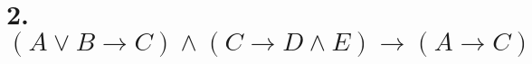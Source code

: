 \section*{2. $(A \lor B \rightarrow C) \land (C \rightarrow D \land E) \rightarrow (A \rightarrow C)$}